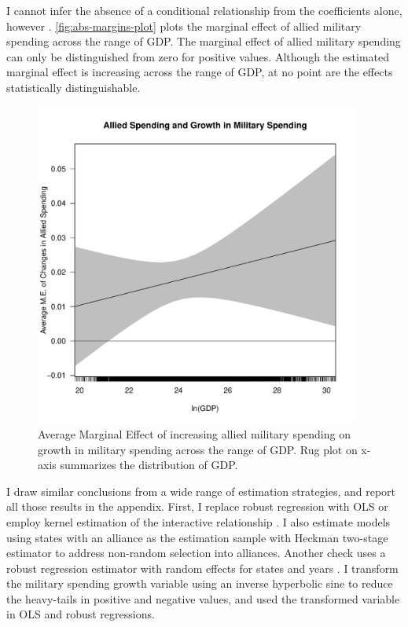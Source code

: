 \documentclass[12pt]{article}
\begin{document}
I cannot infer the absence of a conditional relationship from the coefficients alone, however \citep{BramborClarkGolder2006}. 
\autoref{fig:abs-margins-plot} plots the marginal effect of allied military spending across the range of GDP. 
The marginal effect of allied military spending can only be distinguished from zero for positive values. 
Although the estimated marginal effect is increasing across the range of GDP, at no point are the effects statistically distinguishable. 


\begin{figure}
	\centering
		\includegraphics[width=0.95\textwidth]{abs-margins-plot.pdf}
	\caption{Average Marginal Effect of increasing allied military spending on growth in military spending across the range of GDP. Rug plot on x-axis summarizes the distribution of GDP.}
		\label{fig:abs-margins-plot}
\end{figure}



I draw similar conclusions from a wide range of estimation strategies, and report all those results in the appendix. 
First, I replace robust regression with OLS or employ kernel estimation of the interactive relationship \citep{Hainmuelleretal2019}.
I also estimate models using states with an alliance as the estimation sample with Heckman two-stage estimator to address non-random selection into alliances.
Another check uses a robust regression estimator with random effects for states and years \citep{Koller2016}. 
I transform the military spending growth variable using an inverse hyperbolic sine to reduce the heavy-tails in positive and negative values, and used the transformed variable in OLS and robust regressions. 
\end{document}
